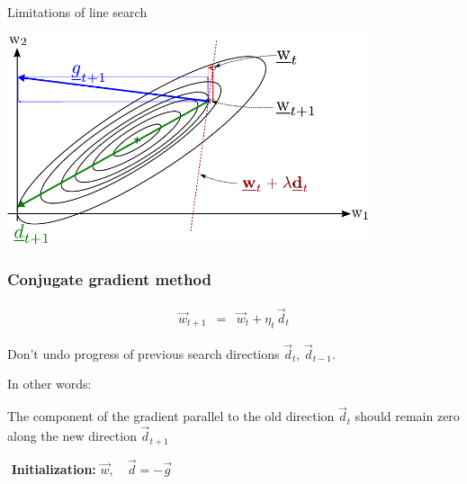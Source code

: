 \begin{frame}{Limitations of line search}
		\begin{center}
			\includegraphics[width=0.8\textwidth]{img/conjugate_direction_c}
		\end{center}
\end{frame}

\begin{frame}\frametitle{Conjugate gradient method}

		\begin{eqnarray}
			\vec{w}_{t+1}
			& =&  \vec{w}_t + \eta_t \, \vec{d}_{t}
		\end{eqnarray}

Don't undo progress of previous search directions $\vec d_{t}$, $\vec d_{t-1}$.

In other words:

The component of the gradient parallel to the old direction $\vec d_{t}$ should
remain zero along the new direction $\vec d_{t+1}$

\pause
	
	\begin{block}{$ $}
		\textbf{Initialization:} $\vec{w},\quad \vec{d} = - \vec{g}$\\
		\vspace{3mm}

	\end{block}

\end{frame}

